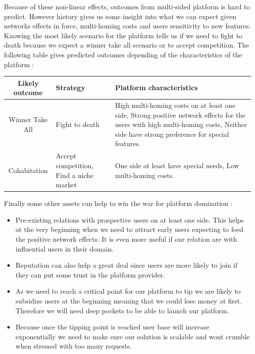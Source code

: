 \documentclass[10pt]{report}
\begin{document}
Because of these non-linear effects, outcomes from multi-sided platform is hard to predict. However history gives us some insight into what we can expect given networks effects in force, multi-homing costs and users sensitivity to new features. Knowing the most likely scenario for the platform tells us if we need to fight to death because we expect a winner take all scenario or to accept competition. The following table gives predicted outcomes depending of the characteristics of the platform :

\begin{center}
\begin{tabularx}{15cm}{|c|p{3.5cm}|X|}
\hline
Likely outcome & Strategy & Platform characteristics \tabularnewline
\hline
Winner Take All & Fight to death & High multi-homing costs on at least one side, Strong positive network effects for the users with high multi-homing costs, Neither side have strong preference for special features.\\
\hline
Cohabitation & Accept competition, Find a niche market & One side at least have special needs, Low multi-homing costs.\\
\hline
\end{tabularx}
\end{center}

Finally some other assets can help to win the war for platform domination \autocite{eisenmann2006strategies} :
\begin{itemize}
\item Pre-existing relations with prospective users on at least one side. This helps at the very beginning when we need to attract early users expecting to feed the positive network effects. It is even more useful if our relation are with influential users in their domain.
\item Reputation can also help a great deal since users are more likely to join if they can put some trust in the platform provider.
\item As we need to reach a critical point for our platform to tip we are likely to subsidize users at the beginning meaning that we could lose money at first. Therefore we will need deep pockets to be able to launch our platform.
\item Because once the tipping point is reached user base will increase exponentially we need to make sure our solution is scalable and wont crumble when stressed with too many requests.
\end{itemize}
\end{document}
